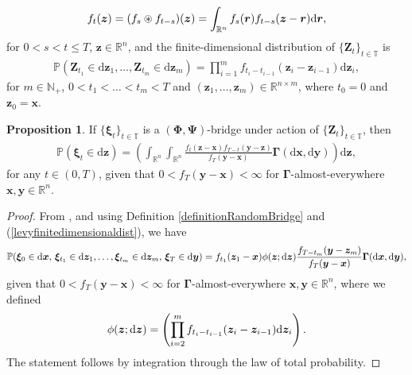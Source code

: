 \documentclass{article}
\def\R{\mathbb{R}}
\def\T{\mathbb{T}}
\def\dd{\mathrm{d}}
\def\xib{\boldsymbol{\xi}}
\theoremstyle{definition}
\newtheorem{proposition}{Proposition}[section]
\begin{document}
\begin{align}
f_{t}(\boldsymbol{z})=(f_s \circledast f_{t-s})(\boldsymbol{z}) = \int_{\mathbb{R}^n}f_{s}(\boldsymbol{r})f_{t-s}(\boldsymbol{z}-\boldsymbol{r})\dd \boldsymbol{r}, \notag
\end{align}
for $0<s<t\leq T$, $\boldsymbol{z}\in\R^n$, and the finite-dimensional distribution of $\{\mathbf{Z}_t\}_{t\in\T}$ is
\begin{align}
\label{levyfinitedimensionaldist}
\mathbb{P}(\mathbf{Z}_{t_{1}}\in \dd \boldsymbol{z}_{1},\ldots, \mathbf{Z}_{t_{m}}\in \dd \boldsymbol{z}_{m}) =\prod^{m}_{i=1}f_{t_{i}-t_{i-1}}(\boldsymbol{z}_{i}-\boldsymbol{z}_{i-1})\dd \boldsymbol{z}_{i},
\end{align}
for $m\in\mathbb{N}_{+}$, $0<t_{1}<\ldots <t_{m} < T$ and $(\boldsymbol{z}_{1},\ldots,\boldsymbol{z}_m)\in\mathbb{R}^{n\times m}$, where $t_0 = 0$ and $\boldsymbol{z}_{0} = \boldsymbol{x}$.
\begin{proposition}
\label{generaldensityexpression}
If $\{\xib_t\}_{t\in\T}$ is a $(\boldsymbol{\Phi}, \boldsymbol{\Psi})$-bridge under action of $\{\boldsymbol{Z}_t\}_{t\in\T}$, then
\begin{align}
\mathbb{P}(\xib_t \in \dd \boldsymbol{z}) = \left(\int_{\R^n}\int_{\R^n}\frac{f_{t}(\boldsymbol{z} - \boldsymbol{x})f_{T-t}(\boldsymbol{y} - \boldsymbol{z})}{f_T(\boldsymbol{y} - \boldsymbol{x})}\boldsymbol{\Gamma}(\dd \boldsymbol{x},\dd \boldsymbol{y})\right)\dd \boldsymbol{z}, \label{levyrandombridgedistribution}
\end{align}
for any $t\in(0,T)$, given that $0 < f_T(\boldsymbol{y}-\boldsymbol{x}) < \infty$ for $\boldsymbol{\Gamma}$-almost-everywhere $\boldsymbol{x},\boldsymbol{y}\in\R^n$.
\end{proposition}
\begin{proof}
From \cite{hoylehughstonmacrina_2011}, and using Definition \ref{definitionRandomBridge} and (\ref{levyfinitedimensionaldist}), we have
\begin{align}
\mathbb{P}(\xib_0 \in \dd \boldsymbol{x}, \, \xib_{t_{1}}\in \dd \boldsymbol{z}_{1},\ldots, \xib_{t_{m}}\in \dd \boldsymbol{z}_{m}, \, \xib_T \in \dd \boldsymbol{y}) = f_{t_1}(\boldsymbol{z}_{1} - \boldsymbol{x})\phi(\boldsymbol{z};\dd\boldsymbol{z})\frac{f_{T-t_m}(\boldsymbol{y} - \boldsymbol{z}_{m})}{f_T(\boldsymbol{y} - \boldsymbol{x})}\boldsymbol{\Gamma}(\dd \boldsymbol{x}, \dd \boldsymbol{y}), \notag
\end{align}
given that $0 < f_T(\boldsymbol{y}-\boldsymbol{x}) < \infty$ for $\boldsymbol{\Gamma}$-almost-everywhere $\boldsymbol{x},\boldsymbol{y}\in\R^n$, where we defined 
\begin{align}
\phi(\boldsymbol{z};\dd\boldsymbol{z}) = \left(\prod^{m}_{i=2}f_{t_{i}-t_{i-1}}(\boldsymbol{z}_{i}-\boldsymbol{z}_{i-1})\dd \boldsymbol{z}_{i}\right). \notag
\end{align}
The statement follows by integration through the law of total probability.
\end{proof}
\end{document}

